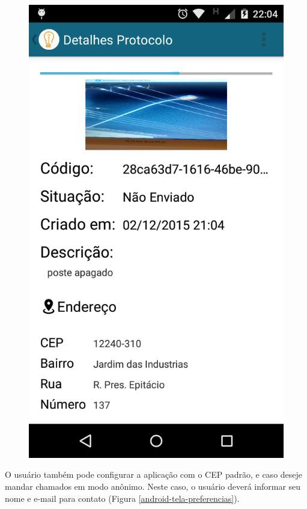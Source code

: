 \documentclass[
	article,			%
	11pt,				%
	oneside,			%
	a4paper,			%
	english,			%
	brazil,				%
	sumario=tradicional
	]{abntex2}
\begin{document}
\begin{figure}[!htbp]
\begin{minipage}{0.4\textwidth}
    \includegraphics[scale=0.1]{android/8.png}
  \end{minipage}
\end{figure}

O usuário também pode configurar a aplicação com o CEP padrão, e caso deseje mandar chamados em modo
anônimo. Neste caso, o usuário deverá informar seu nome e e-mail para contato (Figura \ref{android-tela-preferencias}).
\end{document}
